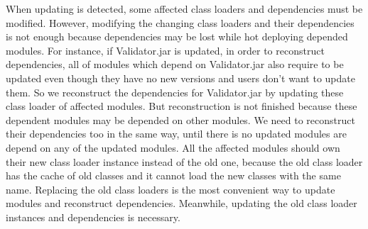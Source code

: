 \documentclass[conference]{IEEEtran}
\begin{document}
When updating is detected, some affected class loaders and dependencies must be modified.
However, modifying the changing class loaders and their dependencies is not enough because dependencies may be lost while hot deploying depended modules.
For instance, if Validator.jar is updated, in order to reconstruct dependencies, all of modules which depend on Validator.jar also require to be updated even though they have no new versions and users don't want to update them.
So we reconstruct the dependencies for Validator.jar by updating these class loader of affected modules.
But reconstruction is not finished because these dependent modules may be depended on other modules.
We need to reconstruct their dependencies too in the same way, until there is no updated modules are depend on any of the updated modules.
All the affected modules should own their new class loader instance instead of the old one, because the old class loader has the cache of old classes and it cannot load the new classes with the same name.
Replacing the old class loaders is the most convenient way to update modules and reconstruct dependencies.
Meanwhile, updating the old class loader instances and dependencies is necessary.






\end{document}
